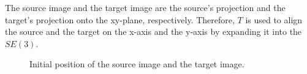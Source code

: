             The source image and the target image are the source’s projection and the target’s projection onto the xy-plane, respectively. 
            Therefore, $T$ is used to align the source and the target on the x-axis and the y-axis by expanding it into the $SE(3)$.

            
            \begin{figure}[htp]
                \centering
                \caption{Initial position of the source image and the target image.}
                \label{fig:2D_initial}
            \end{figure}


